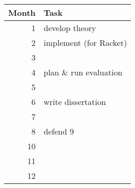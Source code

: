 \begin{tabular}{rl}
  Month & Task \\\hline
  1     & develop theory \\
  2     & implement (for Racket) \\
  3     & \\
  4     & plan \& run evaluation \\
  5     & \\ %
  6     & write dissertation \\
  7     & \\
  8     & defend
  9     & \\
  10    & \\
  11    & \\
  12    & \\
\end{tabular}
